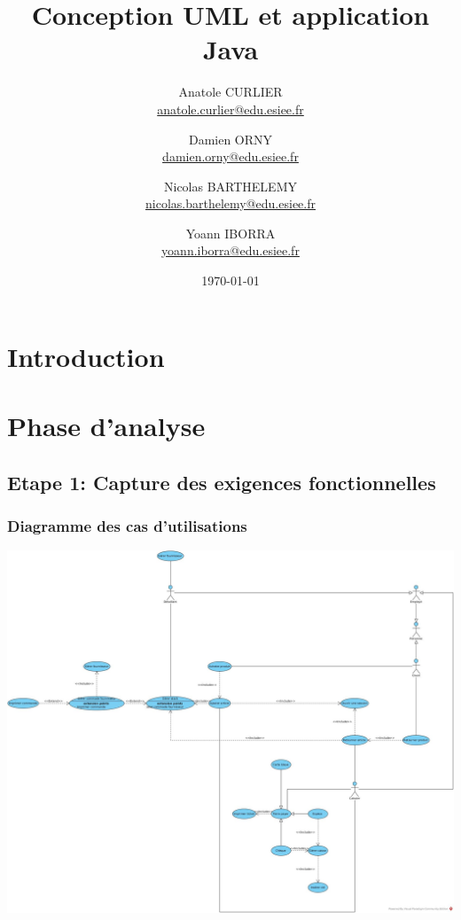 \documentclass[a4paper,table]{article}
\title{Conception UML  et application Java}
\author{
	Anatole CURLIER \\ \href{mailto:anatole.curlier@edu.esiee.fr}{anatole.curlier@edu.esiee.fr} \and
	Damien ORNY \\ \href{mailto:damien.orny@edu.esiee.fr}{damien.orny@edu.esiee.fr} \and
	Nicolas BARTHELEMY \\ \href{mailto:nicolas.barthelemy@edu.esiee.fr}{nicolas.barthelemy@edu.esiee.fr} \and
	Yoann IBORRA \\ \href{mailto:yoann.iborra@edu.esiee.fr} {yoann.iborra@edu.esiee.fr}
}
\date{\today}
\begin{document}
\maketitle
\newpage
\tableofcontents
\newpage

\section*{Introduction}

\newpage

\section{Phase d'analyse}

\subsection{Etape 1: Capture des exigences fonctionnelles}

\subsubsection{Diagramme des cas d'utilisations}

\includegraphics[width=\textwidth]{images/Use_Case.jpg}

\newpage
\end{document}
